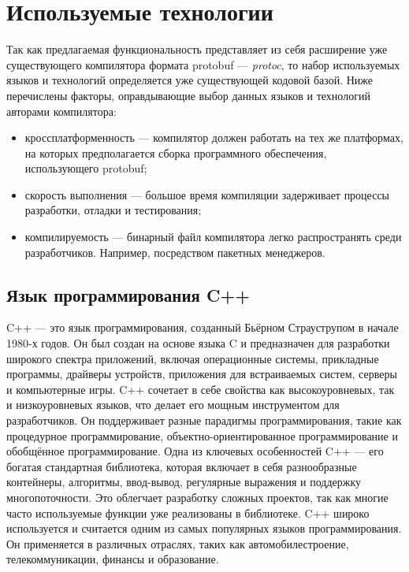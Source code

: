 \section{Используемые технологии}

Так как предлагаемая функциональность представляет из себя расширение уже существующего компилятора формата protobuf --- \textit{protoc}, то набор
используемых языков и технологий определяется уже существующей кодовой базой. Ниже перечислены факторы, оправдывающие выбор данных языков и технологий авторами компилятора:
\begin{itemize}
    \item кроссплатформенность --- компилятор должен работать на тех же платформах, на которых предполагается сборка программного обеспечения, использующего protobuf;
    \item скорость выполнения --- большое время компиляции задерживает процессы разработки, отладки и тестирования;
    \item компилируемость --- бинарный файл компилятора легко распространять среди разработчиков. Например, посредством пакетных менеджеров.
\end{itemize}

\subsection{Язык программирования C++}

C++ — это язык программирования, созданный Бьёрном Страуструпом в начале 1980-х годов. Он был создан на основе языка C и предназначен для разработки широкого спектра приложений, включая операционные системы, прикладные программы, драйверы устройств, приложения для встраиваемых систем, серверы и компьютерные игры.
C++ сочетает в себе свойства как высокоуровневых, так и низкоуровневых языков, что делает его мощным инструментом для разработчиков. Он поддерживает разные парадигмы программирования, такие как процедурное программирование, объектно-ориентированное программирование и обобщённое программирование.
Одна из ключевых особенностей C++ --- его богатая стандартная библиотека, которая включает в себя разнообразные контейнеры, алгоритмы, ввод-вывод, регулярные выражения и поддержку многопоточности. Это облегчает разработку сложных проектов, так как многие часто используемые функции уже реализованы в библиотеке.
C++ широко используется и считается одним из самых популярных языков программирования. Он применяется в различных отраслях, таких как автомобилестроение, телекоммуникации, финансы и образование.

